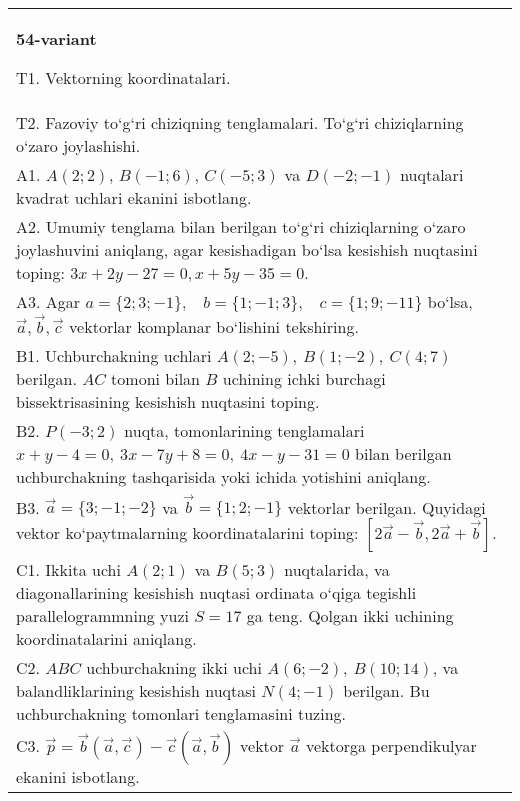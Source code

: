 \documentclass{article}
\begin{document}
\begin{tabular}{m{17cm}}
\textbf{54-variant}
\newline

T1. 
Vektorning koordinatalari.
 \\
T2. 
Fazoviy to‘g‘ri chiziqning tenglamalari. To‘g‘ri chiziqlarning o‘zaro joylashishi.
 \\
A1. 
$A (2;2) $, $B (-1;6) $, $C (-5;3) $ va $D (-2;-1) $
nuqtalari kvadrat uchlari ekanini isbotlang.
 \\
A2. 
Umumiy tenglama bilan berilgan to‘g‘ri chiziqlarning
o‘zaro joylashuvini aniqlang, agar kesishadigan bo‘lsa kesishish nuqtasini
toping: $3x+2y-27=0, x+5y-35=0$.
 \\
A3. 
Agar \(a = \{ 2;3; - 1\}, \ \ \ \ b = \{ 1; - 1;3\}, \ \ \ \ c = \{ 1;9; - 11\}\) bo‘lsa, $\overrightarrow{a}, \overrightarrow{b}, \overrightarrow{c}$ vektorlar komplanar bo‘lishini tekshiring.
 \\
B1. 
Uchburchakning uchlari \(A (2;-5),\ B (1;-2),\ C (4;7) \)
berilgan. $AC$ tomoni bilan $B$ uchining ichki burchagi
bissektrisasining kesishish nuqtasini toping.
 \\
B2. 
\(P (-3;2) \) nuqta, tomonlarining tenglamalari
\(x+y-4=0,\ 3x-7y+8=0,\ 4x-y-31=0\) bilan
berilgan uchburchakning tashqarisida yoki ichida yotishini aniqlang.
 \\
B3. 
$\vec{a} = \{ 3; - 1; - 2\}$ va $\vec{b} = \{ 1;2; - 1\}$ vektorlar berilgan. Quyidagi vektor ko‘paytmalarning koordinatalarini toping:
$\left\lbrack 2\vec{a} - \vec{b},2\vec{a} + \vec{b} \right\rbrack$.
 \\
C1. 
Ikkita uchi \(A (2;1) \) va \(B (5; 3) \) nuqtalarida, va
diagonallarining kesishish nuqtasi ordinata o‘qiga tegishli
parallelogrammning yuzi \(S = 17\) ga teng. Qolgan ikki uchining
koordinatalarini aniqlang. \\
C2. 
$ABC$ uchburchakning ikki uchi
\(A (6; - 2),\ B (10;14) \), va balandliklarining kesishish nuqtasi
\(N (4; - 1) \) berilgan. Bu uchburchakning tomonlari tenglamasini tuzing.
 \\
C3. 
\(\vec{p} = \vec{b} (\vec{a},\vec{c}) - \vec{c} (\vec{a},\vec{b}) \) vektor \(\vec{a}\) vektorga perpendikulyar ekanini isbotlang.
 \\

\end{tabular}
\vspace{1cm}
\end{document}
